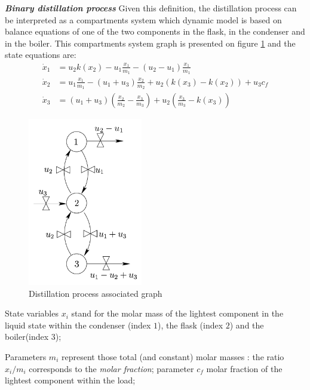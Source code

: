 \begin{exemple}{\bf \em Binary distillation process}
Given this definition, the distillation process can be interpreted as a compartments system which dynamic model is based on
balance equations of one of the two components in the flask, in the condenser and in the boiler.
This compartments system graph is presented on figure \ref{Fig:graphdisti} and the state equations are:
\begin{equation*} \begin{split}
\dot x_1 &= u_2 k(x_2) - u_{1}\frac{x_1}{m_1} - (u_2 - u_1) \frac{x_1}{m_1}\\
\dot x_2 &= u_1\frac{x_1}{m_1} - (u_1+u_3)\frac{x_2}{m_2} + u_2(k(x_3) - k(x_2)) + u_3c_f\\
\dot x_3 &= (u_1 + u_3)(\frac{x_2}{m_2} - \frac{x_3}{m_3}) + u_2(\frac{x_3}{m_3} - k(x_3))
\end{split} \end{equation*}
\begin{figure}[h]
\begin{center}
\includegraphics[width=5cm]{graphprocdistil}
\caption{Distillation process associated graph}
\label{Fig:graphdisti}
\end{center} 
\end{figure}
State variables $x_i$ stand for the molar mass of the lightest component in the liquid state within
the condenser (index $1$), the flask (index $2$) and the boiler(index  $3$);

Parameters $m_i$ represent those total (and constant) molar masses : 
the ratio $x_i/m_i$ corresponds to the {\it molar fraction}; 
parameter $c_f$ molar fraction of the lightest component within the load; 


\end{exemple}
